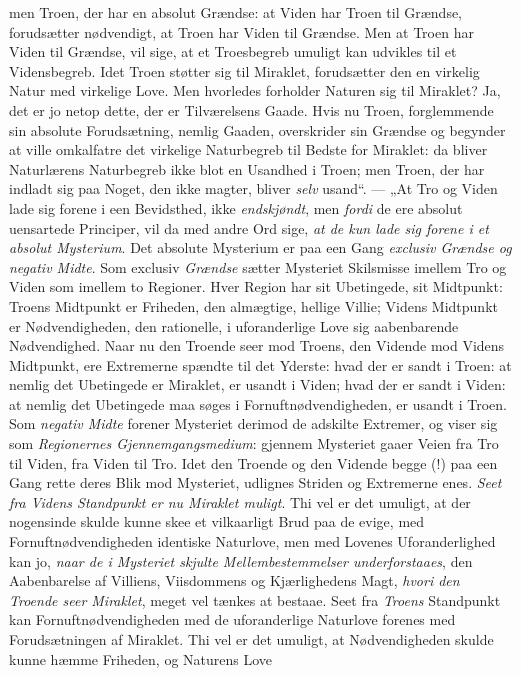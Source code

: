 \documentclass[12pt,a4paper]{book}
\newcommand{\opage}[1]{\marginnote{\footnotesize\textit{[#1]}}}
\begin{document}
men Troen, der har en absolut Grændse: at Viden har Troen til Grændse, forudsætter nødvendigt,
at Troen har Viden til Grændse. Men at Troen har Viden til Grændse, vil sige, at et
Troesbegreb umuligt kan udvikles til et Vidensbegreb. Idet Troen støtter sig til Miraklet,
forudsætter den en virkelig Natur med virkelige Love. Men hvorledes forholder Naturen sig til
Miraklet? Ja, det er jo netop dette, der er Tilværelsens Gaade. Hvis nu Troen, forglemmende
sin absolute Forudsætning, nemlig Gaaden, overskrider sin Grændse og begynder at ville
omkalfatre det virkelige Naturbegreb til Bedste for Miraklet: da bliver Naturlærens
Naturbegreb ikke blot en Usandhed i Troen; men Troen, der har indladt sig paa Noget, den ikke
magter, bliver \emph{selv} usand“. --- „At Tro og Viden lade sig forene i een Bevidsthed, ikke \emph{endskjøndt}, men \emph{fordi} de ere absolut uensartede Principer, vil da med andre Ord sige, \emph{at de kun lade sig forene i et absolut Mysterium}. Det absolute Mysterium er paa een Gang
\emph{exclusiv Grændse og negativ Midte}. Som exclusiv \opage{181}\emph{Grændse} sætter Mysteriet
Skilsmisse imellem Tro og Viden som imellem to Regioner. Hver Region har sit Ubetingede, sit
Midtpunkt: Troens Midtpunkt er Friheden, den almægtige, hellige Villie; Videns Midtpunkt er
Nødvendigheden, den rationelle, i uforanderlige Love sig aabenbarende Nødvendighed. Naar nu
den Troende seer mod Troens, den Vidende mod Videns Midtpunkt, ere Extremerne spændte til det
Yderste: hvad der er sandt i Troen: at nemlig det Ubetingede er Miraklet, er usandt i Viden;
hvad der er sandt i Viden: at nemlig det Ubetingede maa søges i Fornuftnødvendigheden, er
usandt i Troen. Som \emph{negativ Midte} forener Mysteriet derimod de adskilte Extremer, og
viser sig som \emph{Regionernes Gjennemgangsmedium}: gjennem Mysteriet gaaer Veien fra Tro til
Viden, fra Viden til Tro. Idet den Troende og den Vidende begge (!) paa een Gang rette deres
Blik mod Mysteriet, udlignes Striden og Extremerne enes. \emph{Seet fra Videns Standpunkt er
nu Miraklet muligt}. Thi vel er det umuligt, at der nogensinde skulde kunne skee et
vilkaarligt Brud paa de evige, med Fornuftnødvendigheden identiske Naturlove, men med Lovenes
Uforanderlighed kan jo, \emph{naar de i Mysteriet skjulte Mellembestemmelser underforstaaes},
den Aabenbarelse af Villiens, Viisdommens og Kjærlighedens Magt, \emph{hvori den Troende seer Miraklet}, meget vel tænkes at bestaae. Seet fra \emph{Troens} Standpunkt kan
Fornuftnødvendigheden med de uforanderlige Naturlove forenes med Forudsætningen af Miraklet.
Thi vel er det umuligt, at Nødvendigheden skulde kunne hæmme Friheden, og Naturens Love
\end{document}

